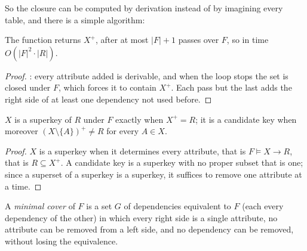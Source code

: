 So the closure can be computed by derivation instead of by imagining every table, and there is a simple algorithm:

\label{lst:b2:database-design:closure}

\begin{proposition}\label{prop:b2:database-design:closure-algo}
The function  returns $X^+$, after at most $|F| + 1$ passes over $F$, so in time $O(|F|^2 \cdot |R|)$.
\end{proposition}

\begin{proof}
: every attribute added is derivable, and when the loop stops the set is closed under
$F$, which forces it to contain $X^+$. Each pass but the last adds the right side of at least one dependency not used
before.
\end{proof}

\begin{corollary}\label{cor:b2:database-design:key-test}
$X$ is a superkey of $R$ under $F$ exactly when $X^+ = R$; it is a candidate key when moreover $(X \setminus \{A\})^+ \neq R$
for every $A \in X$.
\end{corollary}

\begin{proof}
$X$ is a superkey when it determines every attribute, that is $F \models X \to R$, that is $R \subseteq X^+$. A candidate
key is a superkey with no proper subset that is one; since a superset of a superkey is a superkey, it suffices to remove
one attribute at a time.
\end{proof}

\begin{definition}\label{def:b2:database-design:cover}
A \emph{minimal cover} of $F$ is a set $G$ of dependencies equivalent to $F$ (each  every
dependency of the other) in which every right side is a single attribute, no attribute can be removed from a left side,
and no dependency can be removed, without losing the equivalence.
\end{definition}

\label{lst:b2:database-design:keys}

